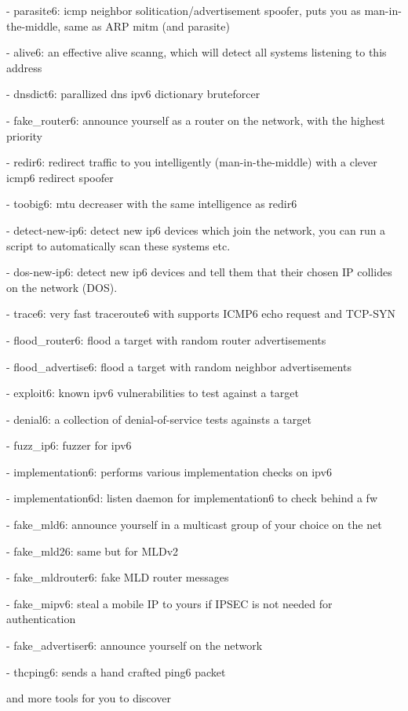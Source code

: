 \documentclass[18pt,landscape,a4paper,footrule]{foils}
\begin{document}
\begin{list2}
\item - parasite6: icmp neighbor solitication/advertisement spoofer, puts you
   as man-in-the-middle, same as ARP mitm (and parasite)
\item - alive6: an effective alive scanng, which will detect all systems
   listening to this address
\item - dnsdict6: parallized dns ipv6 dictionary bruteforcer
\item - fake\_router6: announce yourself as a router on the network, with the
  highest priority
\item - redir6: redirect traffic to you intelligently (man-in-the-middle) with
    a clever icmp6 redirect spoofer
\item - toobig6: mtu decreaser with the same intelligence as redir6
\item - detect-new-ip6: detect new ip6 devices which join the network, you can
    run a script to automatically scan these systems etc.
\item - dos-new-ip6: detect new ip6 devices and tell them that their chosen IP
    collides on the network (DOS).
\item - trace6: very fast traceroute6 with supports ICMP6 echo request and TCP-SYN
\item - flood\_router6: flood a target with random router advertisements
\item - flood\_advertise6: flood a target with random neighbor advertisements
\item - exploit6: known ipv6 vulnerabilities to test against a target
\item - denial6: a collection of denial-of-service tests againsts a target
\item - fuzz\_ip6: fuzzer for ipv6
\item - implementation6: performs various implementation checks on ipv6
\item - implementation6d: listen daemon for implementation6 to check behind a fw
\item - fake\_mld6: announce yourself in a multicast group of your choice on the net
\item - fake\_mld26: same but for MLDv2
\item - fake\_mldrouter6: fake MLD router messages
\item - fake\_mipv6: steal a mobile IP to yours if IPSEC is not needed for authentication
\item - fake\_advertiser6: announce yourself on the network
\item - thcping6: sends a hand crafted ping6 packet
\item  [and more tools for you to discover]

\end{list2}
\end{document}
